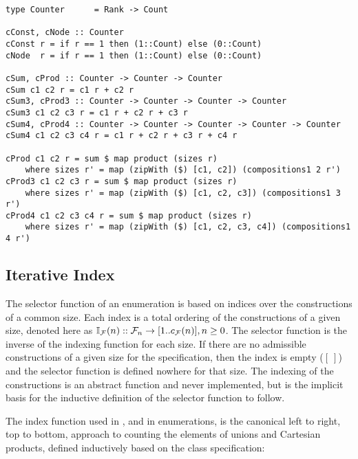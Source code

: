\begin{lstlisting}
type Counter      = Rank -> Count

cConst, cNode :: Counter
cConst r = if r == 1 then (1::Count) else (0::Count)
cNode  r = if r == 1 then (1::Count) else (0::Count)

cSum, cProd :: Counter -> Counter -> Counter
cSum c1 c2 r = c1 r + c2 r
cSum3, cProd3 :: Counter -> Counter -> Counter -> Counter
cSum3 c1 c2 c3 r = c1 r + c2 r + c3 r
cSum4, cProd4 :: Counter -> Counter -> Counter -> Counter -> Counter
cSum4 c1 c2 c3 c4 r = c1 r + c2 r + c3 r + c4 r

cProd c1 c2 r = sum $ map product (sizes r)
    where sizes r' = map (zipWith ($) [c1, c2]) (compositions1 2 r')
cProd3 c1 c2 c3 r = sum $ map product (sizes r)
    where sizes r' = map (zipWith ($) [c1, c2, c3]) (compositions1 3 r')
cProd4 c1 c2 c3 c4 r = sum $ map product (sizes r)
    where sizes r' = map (zipWith ($) [c1, c2, c3, c4]) (compositions1 4 r')

\end{lstlisting}

\subsection{Iterative Index}

The selector function of an enumeration is based on 
indices over the constructions of a common size.
Each index is a total ordering of the constructions of a given size,
denoted here as $ \mathbb{I}_{\mathcal{F}}(n) :: \mathcal{F}_{n} \rightarrow [1 .. c_{\mathcal{F}}(n)], n \ge 0$.
The selector function is the inverse of the indexing function for each size.
If there are no admissible constructions of a given size for the specification,
then the index is empty ($[\ ]$) and the selector function is defined nowhere for that size.
The indexing of the constructions is an abstract function and never implemented,
but is the implicit basis for the inductive definition of the selector function to follow.

The index function used in \cite{FlajoletZC94},
and in \GC enumerations,
is the canonical left to right, top to bottom, approach to counting the elements of unions and Cartesian products,
defined inductively based on the class specification:

